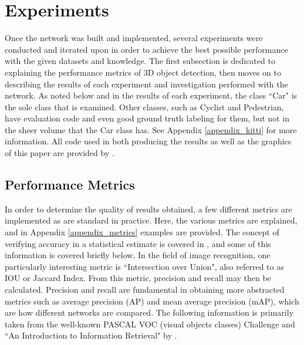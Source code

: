 \newpage
\section{Experiments}
\label{sect_experiments}
Once the network was built and implemented, several experiments were conducted and iterated upon in order to achieve the best possible performance with the given datasets and knowledge. The first subsection is dedicated to explaining the performance metrics of 3D object detection, then moves on to describing the results of each experiment and investigation performed with the network. As noted below and in the results of each experiment, the class ``Car" is the sole class that is examined. Other classes, such as Cyclist and Pedestrian, have evaluation code and even good ground truth labeling for them, but not in the sheer volume that the Car class has. See Appendix \ref{appendix_kitti} for more information. All code used in both producing the results as well as the graphics of this paper are provided by \cite{gonzalez_smart3d_2019}. 

\subsection{Performance Metrics}
In order to determine the quality of results obtained, a few different metrics are implemented as are standard in practice. Here, the various metrics are explained, and in Appendix \ref{appendix_metrics} examples are provided. The concept of verifying accuracy in a statistical estimate is covered in \cite{manning_introduction_2008}, and some of this information is covered briefly below. In the field of image recognition, one particularly interesting metric is ``Intersection over Union", also referred to as IOU or Jaccard Index. From this metric, precision and recall may then be calculated. Precision and recall are fundamental in obtaining more abstracted metrics such as average precision (AP) and mean average precision (mAP), which are how different networks are compared. The following information is primarily taken from the well-known PASCAL VOC (visual objects classes) Challenge \cite{everingham_pascal_2010} and ``An Introduction to Information Retrieval" by \cite{manning_introduction_2008}.

